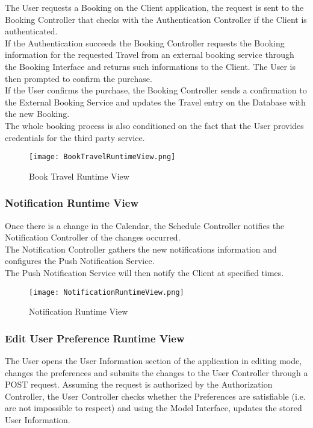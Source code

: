 The User requests a Booking on the Client application, the request is sent to the Booking Controller that checks with the Authentication Controller if the Client is authenticated.\\
If the Authentication succeeds the Booking Controller requests the Booking information for the requested Travel from an external booking service through the Booking Interface and returns such informations to the Client.
The User is then prompted to confirm the purchase.\\
If the User confirms the purchase, the Booking Controller sends a confirmation to the External Booking Service and updates the Travel entry on the Database with the new Booking.\\
The whole booking process is also conditioned on the fact that the User provides credentials for the third party service.

\begin{figure}[H]
	\centering
	\texttt{[image: BookTravelRuntimeView.png]}
	\caption{Book Travel Runtime View}
\end{figure}

\subsubsection{Notification Runtime View}

Once there is a change in the Calendar, the Schedule Controller notifies the Notification Controller of the changes occurred.\\
The Notification Controller gathers the new notifications information and configures the Push Notification Service.\\
The Push Notification Service will then notify the Client at specified times.

\begin{figure}[H]
	\centering
	\texttt{[image: NotificationRuntimeView.png]}
	\caption{Notification Runtime View}
\end{figure}

\subsubsection{Edit User Preference Runtime View}

The User opens the User Information section of the application in editing mode, changes the preferences and submits the changes to the User Controller through a POST request. Assuming the request is authorized by the Authorization Controller, the User Controller checks whether the Preferences are satisfiable (i.e. are not impossible to respect) and using the Model Interface, updates the stored User Information.

